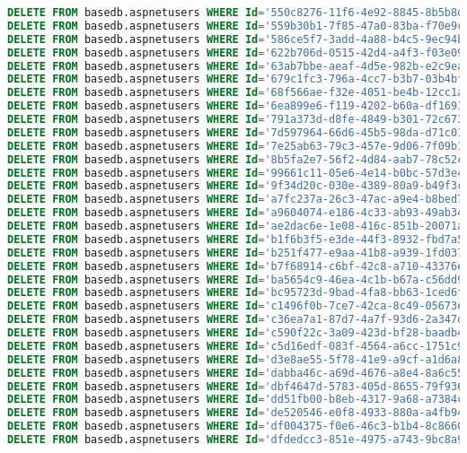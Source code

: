 \documentclass[12pt]{article}
\begin{document}
\begin{lstlisting}[language=SQL]
DELETE FROM basedb.aspnetusers WHERE Id='550c8276-11f6-4e92-8845-8b5b8d8f0008';
DELETE FROM basedb.aspnetusers WHERE Id='559b30b1-7f85-47a0-83ba-f70e9c3d35aa';
DELETE FROM basedb.aspnetusers WHERE Id='586ce5f7-3add-4a88-b4c5-9ec94bd79d70';
DELETE FROM basedb.aspnetusers WHERE Id='622b706d-0515-42d4-a4f3-f03e0990daca';
DELETE FROM basedb.aspnetusers WHERE Id='63ab7bbe-aeaf-4d5e-982b-e2c9ea73938d';
DELETE FROM basedb.aspnetusers WHERE Id='679c1fc3-796a-4cc7-b3b7-03b4bf0e9d13';
DELETE FROM basedb.aspnetusers WHERE Id='68f566ae-f32e-4051-be4b-12cc1a23ec01';
DELETE FROM basedb.aspnetusers WHERE Id='6ea899e6-f119-4202-b60a-df1691472fa4';
DELETE FROM basedb.aspnetusers WHERE Id='791a373d-d8fe-4849-b301-72c67383ed58';
DELETE FROM basedb.aspnetusers WHERE Id='7d597964-66d6-45b5-98da-d71c01b12f67';
DELETE FROM basedb.aspnetusers WHERE Id='7e25ab63-79c3-457e-9d06-7f09b164f132';
DELETE FROM basedb.aspnetusers WHERE Id='8b5fa2e7-56f2-4d84-aab7-78c52ca4c1db';
DELETE FROM basedb.aspnetusers WHERE Id='99661c11-05e6-4e14-b0bc-57d3e458ebcb';
DELETE FROM basedb.aspnetusers WHERE Id='9f34d20c-030e-4389-80a9-b49f3c43143b';
DELETE FROM basedb.aspnetusers WHERE Id='a7fc237a-26c3-47ac-a9e4-b8bed7fd3824';
DELETE FROM basedb.aspnetusers WHERE Id='a9604074-e186-4c33-ab93-49ab34e39ce1';
DELETE FROM basedb.aspnetusers WHERE Id='ae2dac6e-1e08-416c-851b-20071a792672';
DELETE FROM basedb.aspnetusers WHERE Id='b1f6b3f5-e3de-44f3-8932-fbd7a53f6b3c';
DELETE FROM basedb.aspnetusers WHERE Id='b251f477-e9aa-41b8-a939-1fd0374dc310';
DELETE FROM basedb.aspnetusers WHERE Id='b7f68914-c6bf-42c8-a710-43376e8a8586';
DELETE FROM basedb.aspnetusers WHERE Id='ba5654c9-46ea-4c1b-b67a-c56dd9bcca5c';
DELETE FROM basedb.aspnetusers WHERE Id='bc95723d-9bad-4fa8-bb63-1ced6ffc5c80';
DELETE FROM basedb.aspnetusers WHERE Id='c1496f0b-7ce7-42ca-8c49-05673eceee83';
DELETE FROM basedb.aspnetusers WHERE Id='c36ea7a1-87d7-4a7f-93d6-2a347de37b5d';
DELETE FROM basedb.aspnetusers WHERE Id='c590f22c-3a09-423d-bf28-baadb449a369';
DELETE FROM basedb.aspnetusers WHERE Id='c5d16edf-083f-4564-a6cc-1751c98ecc3b';
DELETE FROM basedb.aspnetusers WHERE Id='d3e8ae55-5f78-41e9-a9cf-a1d6a8c2ec59';
DELETE FROM basedb.aspnetusers WHERE Id='dabba46c-a69d-4676-a8e4-8a6c5598ab76';
DELETE FROM basedb.aspnetusers WHERE Id='dbf4647d-5783-405d-8655-79f9369c4c8e';
DELETE FROM basedb.aspnetusers WHERE Id='dd51fb00-b8eb-4317-9a68-a7384caa3d3b';
DELETE FROM basedb.aspnetusers WHERE Id='de520546-e0f8-4933-880a-a4fb947a3684';
DELETE FROM basedb.aspnetusers WHERE Id='df004375-f0e6-46c3-b1b4-8c8660705c75';
DELETE FROM basedb.aspnetusers WHERE Id='dfdedcc3-851e-4975-a743-9bc8a91078ef';

\end{lstlisting}
\end{document}
